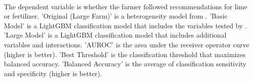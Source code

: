 \begin{table}[H] \centering
{}

\caption{Model Results Comparison: Fertilizer}
\\ \parbox{0.79\linewidth}{\tiny The dependent variable is whether the farmer followed recommendations for lime or fertilizer. 'Original (Large Farm)' is a heterogeneity model from \textcite{fabregas_digital_2025}. 'Basic Model' is a LightGBM classification model that includes the variables tested by \textcite{fabregas_digital_2025}. 'Large Model'  is a LightGBM classification model that includes additional variables and interactions. 'AUROC' is the area under the receiver operator curve (higher is better). 'Best Threshold' is the classification threshold that maximizes balanced accuracy. 'Balanced Accuracy' is the average of classification sensitivity and specificity (higher is better).}
\end{table}

